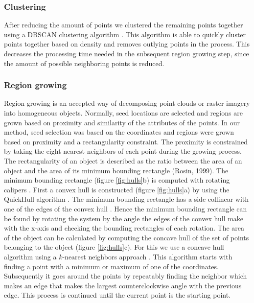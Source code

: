 \subsubsection{Clustering}
After reducing the amount of points we clustered the remaining points together using a DBSCAN clustering algorithm \citep{ester1996density}. This algorithm is able to quickly cluster points together based on density and removes outlying points in the process. This decreases the processing time needed in the subsequent region growing step, since the amount of possible neighboring points is reduced.

\subsubsection{Region growing}
Region growing is an accepted way of decomposing point clouds \citep{rabbani2006segmentation, vosselman2013point} or raster imagery \citep{blaschke2014geographic} into homogeneous objects. Normally, seed locations are selected and regions are grown based on proximity and similarity of the attributes of the points. In our method, seed selection was based on the coordinates and regions were grown based on proximity and a rectangularity constraint. The proximity is constrained by taking the eight nearest neighbors of each point during the growing process. The rectangularity of an object is described as the ratio between the area of an object and the area of its minimum bounding rectangle (Rosin, 1999). The minimum bounding rectangle (figure \ref{fig:hulls}b) is computed with rotating calipers \citep{toussaint1983solving}. First a convex hull is constructed (figure \ref{fig:hulls}a) by using the QuickHull algorithm \citep{preparata1985computational}. The minimum bounding rectangle has a side collinear with one of the edges of the convex hull \citep{freeman1975determining}. Hence the minimum bounding rectangle can be found by rotating the system by the angle the edges of the convex hull make with the x-axis and checking the bounding rectangles of each rotation. The area of the object can be calculated by computing the concave hull of the set of points belonging to the object (figure \ref{fig:hulls}c). For this we use a concave hull algorithm using a \(k\)-nearest neighbors approach \citep{moreira2007concave}. This algorithm starts with finding a point with a minimum or maximum of one of the coordinates. Subsequently it goes around the points by repeatably finding the neighbor which makes an edge that makes the largest counterclockwise angle with the previous edge. This process is continued until the current point is the starting point. %

